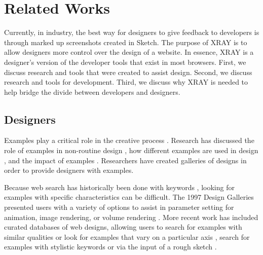 \documentclass{sigchi}
\newcommand{\xray}{XRAY\xspace}
\begin{document}
\section{Related Works}
Currently, in industry, the best way for designers to give feedback to developers is through marked up screenshots created in Sketch. The purpose of \xray is to allow designers more control over the design of a website. In essence, \xray is a designer's version of the developer tools that exist in most browsers. First, we discuss research and tools that were created to assist design. Second, we discuss research and tools for development. Third, we discuss why \xray is needed to help bridge the divide between developers and designers.  

\subsection{Designers}
Examples play a critical role in the creative process \cite{getting_inspired_designs_in_creativity_Herring_CHI_2009}. Research has discussed the role of examples in non-routine design \cite{creativity_in_design_activities_Bonnardel_CandC_1999}, how different examples are used in design \cite{getting_inspired_designs_in_creativity_Herring_CHI_2009}, and the impact of examples \cite{effects_of_examples_on_design_activities_Purcell_1992_kbc}. Researchers have created galleries of designs in order to provide designers with examples.

Because web search has historically been done with keywords \cite{cueflik_interactive_concept_leraning_Fogarty_CHI_2008}, looking for examples with specific characteristics can be difficult. The 1997 Design Galleries presented users with a variety of options to assist in parameter setting for animation, image rendering, or volume rendering \cite{designGalleries_mitsubishi_Marks_SIGGRAPH_1997}. More recent work has included curated databases of web designs, allowing users to search for examples with similar qualities or look for examples that vary on a particular axis \cite{interactive_example_galleries_Lee_CHI_2010}, search for examples with stylistic keywords \cite{dtour_Ritchie_UIST_2011} or via the input of a rough sketch \cite{retrieving_websites_with_sketches_example_based_design_hashimoto_igarashi_EUROGRAPHICS_EWSBIM_2005}. 
\end{document}
